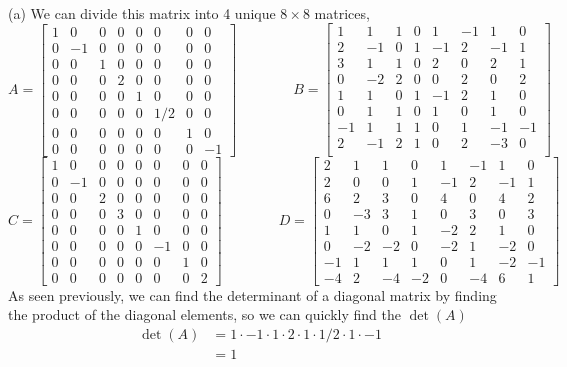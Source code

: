 \documentclass{report}
\begin{document}
\sol \\
(a) We can divide this matrix into 4 unique $8\times8$ matrices,
$$
A = \begin{bmatrix}
1&0&0&0&0&0&0&0\\
0&-1&0&0&0&0&0&0\\
0&0&1&0&0&0&0&0\\
0&0&0&2&0&0&0&0\\
0&0&0&0&1&0&0&0\\
0&0&0&0&0&1/2 &0&0\\
0&0&0&0&0&0&1&0\\
0&0&0&0&0&0&0&-1
\end{bmatrix} \qquad \qquad
B = \begin{bmatrix}
1&1&1&0&1&-1&1&0\\
2&-1&0&1&-1&2&-1&1\\
3&1&1&0&2&0&2&1\\
0&-2&2&0&0&2&0&2\\
1&1&0&1&-1&2&1&0\\
0&1&1&0&1&0&1&0\\
-1&1&1&1&0&1&-1&-1\\
2&-1&2&1&0&2&-3&0\\
\end{bmatrix}
$$
$$
C =
\begin{bmatrix}
1&0&0&0&0&0&0&0 \\
0&-1&0&0&0&0&0&0 \\
0&0&2&0&0&0&0&0 \\
0&0&0&3&0&0&0&0 \\
0&0&0&0&1&0&0&0 \\
0&0&0&0&0&-1&0&0 \\
0&0&0&0&0&0&1&0 \\
0&0&0&0&0&0&0&2
\end{bmatrix} \qquad \qquad
D = \begin{bmatrix}
2&1&1&0&1&-1&1&0\\
2&0&0&1&-1&2&-1&1\\
6&2&3&0&4&0&4&2\\
0&-3&3&1&0&3&0&3\\
1&1&0&1&-2&2&1&0\\
0&-2&-2&0&-2&1&-2&0\\
-1&1&1&1&0&1&-2&-1\\
-4&2&-4&-2&0&-4&6&1
\end{bmatrix}
$$
As seen previously,  we can find the determinant of a diagonal matrix by finding the product of the diagonal elements,  so we can quickly find the $\det(A)$
$$
\begin{aligned}
\det(A) & = 1 \cdot -1 \cdot 1 \cdot 2 \cdot 1 \cdot 1/2 \cdot 1 \cdot -1 \\
& = 1
\end{aligned}
$$
\end{document}
